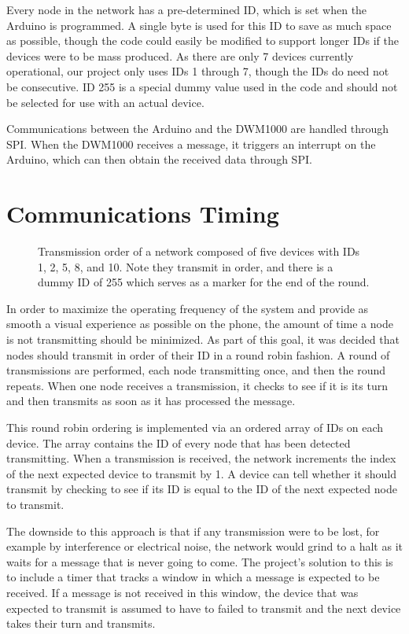 Every node in the network has a pre-determined ID, which is set when the Arduino is programmed. A single byte is used for this ID to save as much space as possible, though the code could easily be modified to support longer IDs if the devices were to be mass produced. As there are only 7 devices currently operational, our project only uses IDs 1 through 7, though the IDs do need not be consecutive. ID 255 is a special dummy value used in the code and should not be selected for use with an actual device.

Communications between the Arduino and the DWM1000 are handled through SPI. When the DWM1000 receives a message, it triggers an interrupt on the Arduino, which can then obtain the received data through SPI.

\section{Communications Timing}
\begin{figure}
	\centering
	
	\decoRule
	\caption{Transmission order of a network composed of five devices with IDs 1, 2, 5, 8, and 10. Note they transmit in order, and there is a dummy ID of 255 which serves as a marker for the end of the round.}
	\label{fig:TransmissionOrder}
\end{figure}

In order to maximize the operating frequency of the system and provide as smooth a visual experience as possible on the phone, the amount of time a node is not transmitting should be minimized. As part of this goal, it was decided that nodes should transmit in order of their ID in a round robin fashion. A round of transmissions are performed, each node transmitting once, and then the round repeats. When one node receives a transmission, it checks to see if it is its turn and then transmits as soon as it has processed the message.

This round robin ordering is implemented via an ordered array of IDs on each device. The array contains the ID of every node that has been detected transmitting. When a transmission is received, the network increments the index of the next expected device to transmit by 1. A device can tell whether it should transmit by checking to see if its ID is equal to the ID of the next expected node to transmit. 

The downside to this approach is that if any transmission were to be lost, for example by interference or electrical noise, the network would grind to a halt as it waits for a message that is never going to come. The project's solution to this is to include a timer that tracks a window in which a message is expected to be received. If a message is not received in this window, the device that was expected to transmit is assumed to have to failed to transmit and the next device takes their turn and transmits.

